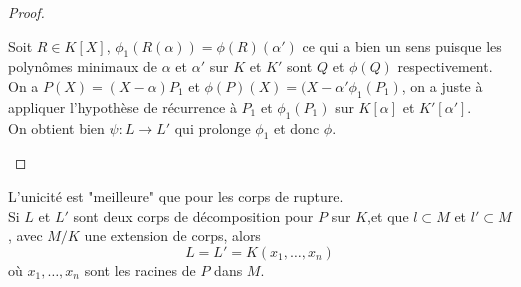 \begin{proof}
\begin{itemize}
		      Soit $R\in K[X]$, $\phi_1(R(\alpha)) = \phi(R)(\alpha')$ ce qui a bien un sens puisque les polynômes minimaux de $\alpha$ et
		      $\alpha'$ sur $K$ et $K'$ sont $Q$ et $\phi(Q)$ respectivement.\\

		      On a $P(X) = (X-\alpha)P_1$ et $\phi(P)(X) = (X-\alpha'\phi_1(P_1)$, on a juste à appliquer l'hypothèse de récurrence à $P_1$ et $\phi_1(P_1)$
		      sur $K[\alpha]$ et $K'[\alpha']$.\\
		      On obtient bien $\psi : L \to L'$ qui prolonge $\phi_1$ et donc $\phi$.
	\end{itemize}
\end{proof}


\begin{remarque}
	L'unicité est "meilleure" que pour les corps de rupture.\\
	Si $L$ et $L'$ sont deux corps de décomposition pour $P$ sur $K$,et que
	$l \subset M$ et $l' \subset M$, avec $M/K$ une extension de corps, alors
	$$L = L' = K(x_1, \ldots, x_n)$$
	où $x_1, \ldots, x_n$ sont les racines de $P$ dans $M$.
\end{remarque}
